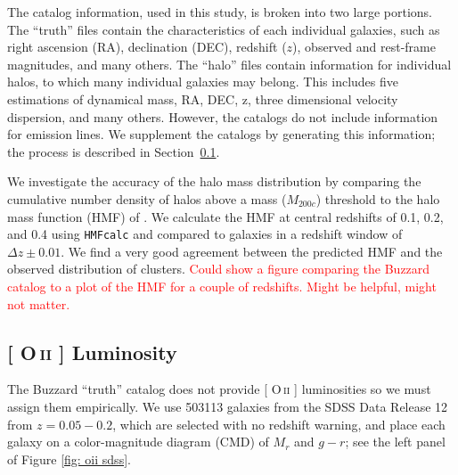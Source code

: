 \documentclass[fleqn,usenatbib]{mnras}
\makeatletter
\newcommand{\editorial}[1]{\textcolor{red}{#1}}
\DeclareRobustCommand{\ion}[2]{%
\relax\ifmmode
\ifx\testbx\f@series
{\mathbf{#1\,\mathsc{#2}}}\else
{\mathrm{#1\,\mathsc{#2}}}\fi
\else\textup{#1\,{\mdseries\textsc{#2}}}%
\fi}
\makeatother
\begin{document}
The catalog information, used in this study, is broken into two large portions. The ``truth'' files contain the characteristics of each individual galaxies, such as right ascension (RA), declination (DEC), redshift ($z$), observed and rest-frame magnitudes, and many others. The ``halo'' files contain information for individual halos, to which many individual galaxies may belong. This includes five estimations of dynamical mass, RA, DEC, z, three dimensional velocity dispersion, and many others. However, the catalogs do not include information for emission lines. We supplement the catalogs by generating this information; the process is described in Section~\ref{sec: oii luminosity}.


We investigate the accuracy of the halo mass distribution by comparing the cumulative number density of halos above a mass ($M_{200c}$) threshold to the halo mass function (HMF) of \cite{Tinker2008}. We calculate the HMF at central redshifts of 0.1, 0.2, and 0.4 using {\tt HMFcalc} \citep{Murray2013} and compared to galaxies in a redshift window of $\Delta z\pm0.01$. We find a very good agreement between the predicted HMF and the observed distribution of clusters. \editorial{Could show a figure comparing the Buzzard catalog to a plot of the HMF for a couple of redshifts. Might be helpful, might not matter.}

\subsection{ {\rm[\ion{O}{ii}]} Luminosity}\label{sec: oii luminosity}
The Buzzard ``truth'' catalog does not provide [\ion{O}{ii}] luminosities so we must assign them empirically. We use 503113 galaxies from the SDSS Data Release 12 \citep{Alam2015} from $z = 0.05 - 0.2$, which are selected with no redshift warning, and place each galaxy on a color-magnitude diagram (CMD) of $M_r$ and $g-r$; see the left panel of Figure \ref{fig: oii sdss}.
\end{document}
